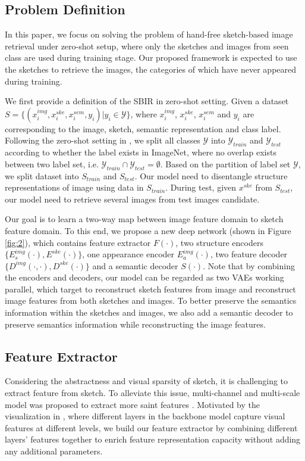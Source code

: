 \documentclass[10pt,twocolumn,letterpaper]{article}
\begin{document}
\subsection{Problem Definition} \label{3.1}
In this paper, we focus on solving the problem of hand-free sketch-based image retrieval under zero-shot setup, where only the sketches and images from seen class are used during training stage. 
Our proposed framework is expected to use the sketches to retrieve the images, the categories of which have never appeared during training.

We first provide a definition of the SBIR in zero-shot setting. 
Given a dataset $S=\{(x_i^{img}, x_i^{ske}, x_i^{sem}, y_i)|y_i \in \mathcal{Y}\}$, where $x_i^{img}$, $x_i^{ske}$, $x_i^{sem}$ and $y_i$ are corresponding to the image, sketch, semantic representation and class label. 
Following the zero-shot setting in \cite{yelamarthi2018zero}, we split all classes $\mathcal{Y}$ into $\mathcal{Y}_{train}$ and $\mathcal{Y}_{test}$ according to whether the label exists in ImageNet\cite{deng2009imagenet}, where no overlap exists between two label set, i.e. $\mathcal{Y}_{train} \cap \mathcal{Y}_{test} = \emptyset$. 
Based on the partition of label set $\mathcal{Y}$, we split dataset into $S_{train}$ and $S_{test}$. 
Our model need to disentangle structure representations of image using data in $S_{train}$. 
During test, given $x^{ske}$ from $S_{test}$, our model need to retrieve several images from test images candidate.

Our goal is to learn a two-way map between image feature domain to sketch feature domain. 
To this end, we propose a new deep network (shown in Figure \ref{fig:2}), which contains feature extractor $F(\cdot)$, two structure encoders $\{E_{s}^{img}(\cdot), E^{ske}(\cdot)\}$, one appearance encoder $E^{img}_{a}(\cdot)$, two feature decoder $\{D^{img}(\cdot, \cdot), D^{ske}(\cdot)\}$ and a semantic decoder $S(\cdot)$. 
Note that by combining the encoders and decoders, our model can be regarded as two VAEs working parallel, which target to reconstruct sketch features from image and reconstruct image features from both sketches and images. 
To better preserve the semantics information within the sketches and images, we also add a semantic decoder to preserve semantics information while reconstructing the image features.

\subsection{Feature Extractor} \label{3.2}
Considering the abstractness and visual sparsity of sketch, it is challenging to extract feature from sketch. 
To alleviate this issue, multi-channel and multi-scale model was proposed to extract more saint features \cite{yu2017sketch}. 
Motivated by the visualization in \cite{zeiler2014visualizing}, where different layers in the backbone model capture visual features at different levels, we build our feature extractor by combining different layers' features together to enrich feature representation capacity without adding any additional parameters.
\end{document}
